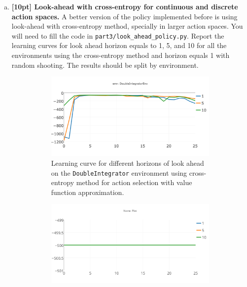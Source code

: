 \documentclass{article}
\begin{document}
\begin{enumerate}[(a)]
\newpage

\item {\bf [10pt] Look-ahead with cross-entropy for continuous and discrete action spaces.} A better version of the policy implemented before is using look-ahead with cross-entropy method, specially in larger action spaces. You will need to fill the code in \texttt{part3/look\_ahead\_policy.py}. Report the learning curves for look ahead horizon equals to 1, 5, and 10 for all the environments using the cross-entropy method and horizon equals 1 with random shooting. The results should be split by environment.

\begin{figure}[h!]
    \centering
    \begin{subfigure}{0.45\textwidth}
        \centering
        \includegraphics[width=\textwidth]{figures/part_3_b_a.png}
          \caption{Learning curve for different horizons of look ahead on the \texttt{DoubleIntegrator} environment using cross-entropy method for action selection with value function approximation.}
    \end{subfigure}
    \hspace{0.2in}
    \begin{subfigure}{0.45\textwidth}
        \centering
        \includegraphics[width=\textwidth]{figures/part_3_b_b.png}

\end{subfigure}
\end{figure}
\end{enumerate}
\end{document}
